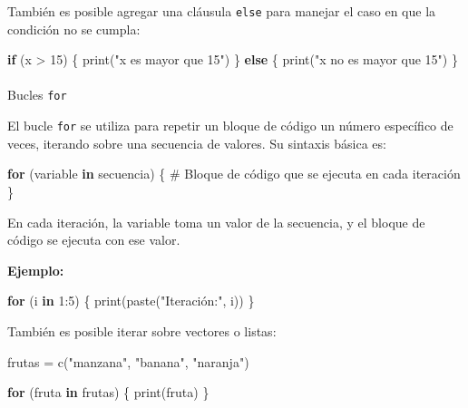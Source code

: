 \documentclass[
  spanish,
  letterpaper,
  DIV=11,
  numbers=noendperiod]{scrreprt}
\makeatletter
\let\oldparagraph\paragraph
\renewcommand{\paragraph}{
    \@ifstar
      \xxxParagraphStar
      \xxxParagraphNoStar
  }
\newcommand{\xxxParagraphStar}[1]{\oldparagraph*{#1}\mbox{}}
\newcommand{\xxxParagraphNoStar}[1]{\oldparagraph{#1}\mbox{}}
\newenvironment{Shaded}{\begin{snugshade}}{\end{snugshade}}
\newcommand{\CommentTok}[1]{\textcolor[rgb]{0.37,0.37,0.37}{#1}}
\newcommand{\ControlFlowTok}[1]{\textcolor[rgb]{0.00,0.23,0.31}{\textbf{#1}}}
\newcommand{\DecValTok}[1]{\textcolor[rgb]{0.68,0.00,0.00}{#1}}
\newcommand{\FunctionTok}[1]{\textcolor[rgb]{0.28,0.35,0.67}{#1}}
\newcommand{\NormalTok}[1]{\textcolor[rgb]{0.00,0.23,0.31}{#1}}
\newcommand{\OtherTok}[1]{\textcolor[rgb]{0.00,0.23,0.31}{#1}}
\newcommand{\SpecialCharTok}[1]{\textcolor[rgb]{0.37,0.37,0.37}{#1}}
\newcommand{\StringTok}[1]{\textcolor[rgb]{0.13,0.47,0.30}{#1}}
\makeatother
\begin{document}
También es posible agregar una cláusula \texttt{else} para manejar el
caso en que la condición no se cumpla:

\begin{Shaded}
\begin{Highlighting}[]
\ControlFlowTok{if}\NormalTok{ (x }\SpecialCharTok{\textgreater{}} \DecValTok{15}\NormalTok{) \{}
  \FunctionTok{print}\NormalTok{(}\StringTok{"x es mayor que 15"}\NormalTok{)}
\NormalTok{\} }\ControlFlowTok{else}\NormalTok{ \{}
  \FunctionTok{print}\NormalTok{(}\StringTok{"x no es mayor que 15"}\NormalTok{)}
\NormalTok{\}}
\end{Highlighting}
\end{Shaded}

\paragraph{\texorpdfstring{Bucles
\texttt{for}}{Bucles for}}\label{bucles-for}

El bucle \texttt{for} se utiliza para repetir un bloque de código un
número específico de veces, iterando sobre una secuencia de valores. Su
sintaxis básica es:

\begin{Shaded}
\begin{Highlighting}[]
\ControlFlowTok{for}\NormalTok{ (variable }\ControlFlowTok{in}\NormalTok{ secuencia) \{}
  \CommentTok{\# Bloque de código que se ejecuta en cada iteración}
\NormalTok{\}}
\end{Highlighting}
\end{Shaded}

En cada iteración, la variable toma un valor de la secuencia, y el
bloque de código se ejecuta con ese valor.

\textbf{Ejemplo:}

\begin{Shaded}
\begin{Highlighting}[]
\ControlFlowTok{for}\NormalTok{ (i }\ControlFlowTok{in} \DecValTok{1}\SpecialCharTok{:}\DecValTok{5}\NormalTok{) \{}
  \FunctionTok{print}\NormalTok{(}\FunctionTok{paste}\NormalTok{(}\StringTok{"Iteración:"}\NormalTok{, i))}
\NormalTok{\}}
\end{Highlighting}
\end{Shaded}

También es posible iterar sobre vectores o listas:

\begin{Shaded}
\begin{Highlighting}[]
\NormalTok{frutas }\OtherTok{=} \FunctionTok{c}\NormalTok{(}\StringTok{"manzana"}\NormalTok{, }\StringTok{"banana"}\NormalTok{, }\StringTok{"naranja"}\NormalTok{)}

\ControlFlowTok{for}\NormalTok{ (fruta }\ControlFlowTok{in}\NormalTok{ frutas) \{}
  \FunctionTok{print}\NormalTok{(fruta)}
\NormalTok{\}}
\end{Highlighting}
\end{Shaded}
\end{document}
